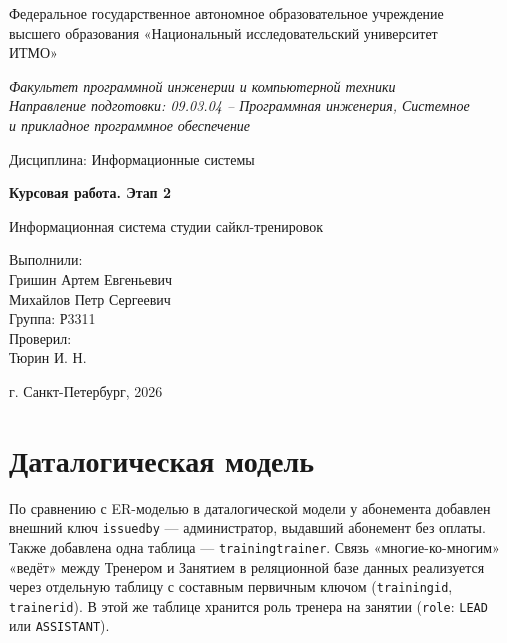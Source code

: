 \documentclass[14pt,a4paper]{extarticle}
\renewcommand{\_}{\textunderscore\allowbreak}
\newcommand{\teacher}{Тюрин И. Н.}
\begin{document}
\begin{titlepage}
  \centering
  \vspace*{5mm}
  Федеральное государственное автономное образовательное учреждение\\
  высшего образования «Национальный исследовательский университет\\
  ИТМО»\par
  \vspace{4mm}
  \textit{Факультет программной инженерии и компьютерной техники}\\
  \textit{Направление подготовки: 09.03.04 -- Программная инженерия, Системное}\\
  \textit{и прикладное программное обеспечение}\par
  \vspace{18mm}
  Дисциплина: Информационные системы\par
  \vspace{30mm}
  {\large\bfseries Курсовая работа. Этап 2\par}
  \vspace{1mm}
  {\large Информационная система студии сайкл-тренировок\par}
  \vfill
  \begin{flushright}
    Выполнили:\\
    Гришин Артем Евгеньевич\\
    Михайлов Петр Сергеевич\\
    Группа: Р3311\\[3mm]
    Проверил:\\
    \teacher
  \end{flushright}
  \vspace{25mm}
  г. Санкт-Петербург, 2026\par
\end{titlepage}

\tableofcontents
\newpage

\section{Даталогическая модель}

По сравнению с ER-моделью в даталогической модели у абонемента добавлен внешний ключ \texttt{issued\_by} --- администратор, выдавший абонемент без оплаты. Также добавлена одна таблица --- \texttt{training\_trainer}. Связь «многие-ко-многим» «ведёт» между Тренером и Занятием в реляционной базе данных реализуется через отдельную таблицу с составным первичным ключом (\texttt{training\_id}, \texttt{trainer\_id}). В этой же таблице хранится роль тренера на занятии (\texttt{role}: \texttt{LEAD} или \texttt{ASSISTANT}).
\end{document}
